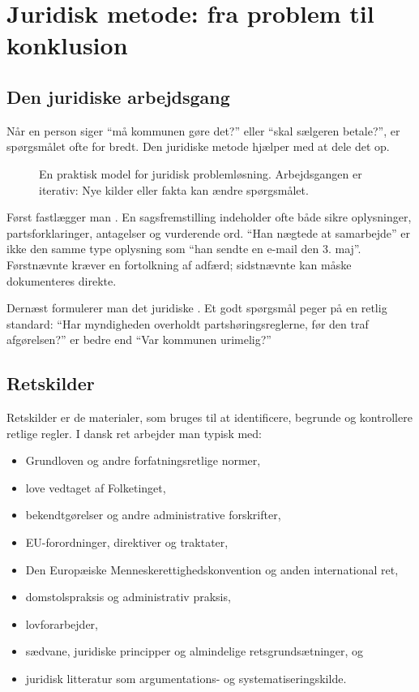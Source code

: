 \chapter{Juridisk metode: fra problem til konklusion}


\section{Den juridiske arbejdsgang}

Når en person siger ``må kommunen gøre det?'' eller ``skal sælgeren betale?'', er spørgsmålet ofte for bredt. Den juridiske metode hjælper med at dele det op.

\begin{figure}[ht]
\centering

\caption{En praktisk model for juridisk problemløsning. Arbejdsgangen er iterativ: Nye kilder eller fakta kan ændre spørgsmålet.}
\label{fig:method}
\end{figure}

Først fastlægger man . En sagsfremstilling indeholder ofte både sikre oplysninger, partsforklaringer, antagelser og vurderende ord. ``Han nægtede at samarbejde'' er ikke den samme type oplysning som ``han sendte en e-mail den 3. maj''. Førstnævnte kræver en fortolkning af adfærd; sidstnævnte kan måske dokumenteres direkte.

Dernæst formulerer man det juridiske . Et godt spørgsmål peger på en retlig standard: ``Har myndigheden overholdt partshøringsreglerne, før den traf afgørelsen?'' er bedre end ``Var kommunen urimelig?''

\section{Retskilder}

Retskilder er de materialer, som bruges til at identificere, begrunde og kontrollere retlige regler. I dansk ret arbejder man typisk med:

\begin{itemize}
  \item Grundloven og andre forfatningsretlige normer,
  \item love vedtaget af Folketinget,
  \item bekendtgørelser og andre administrative forskrifter,
  \item EU-forordninger, direktiver og traktater,
  \item Den Europæiske Menneskerettighedskonvention og anden international ret,
  \item domstolspraksis og administrativ praksis,
  \item lovforarbejder,
  \item sædvane, juridiske principper og almindelige retsgrundsætninger, og
  \item juridisk litteratur som argumentations- og systematiseringskilde.
\end{itemize}

